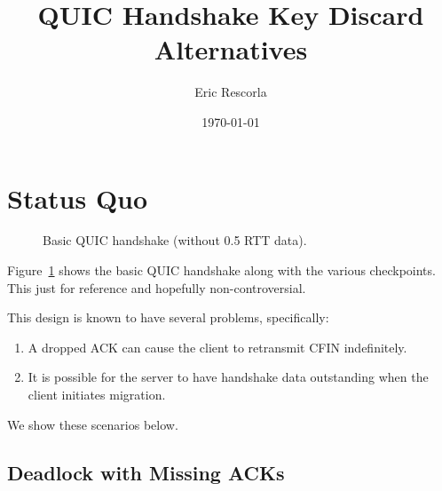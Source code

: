 \documentclass{article}
\title{QUIC Handshake Key Discard Alternatives}
\author{Eric Rescorla}
\date{\today}
\begin{document}
\section{Status Quo}
\label{sec:status-quo}


\begin{figure}[H]
\begin{center}
\end{center}
\caption{Basic QUIC handshake (without 0.5 RTT data).}
\label{fig:basic-handshake}
\end{figure}

Figure~\ref{fig:basic-handshake} shows the basic QUIC handshake along
with the various checkpoints. This just for reference and hopefully
non-controversial.

This design is known to have several problems, specifically:

\begin{enumerate}
\item A dropped ACK can cause the client to retransmit CFIN
  indefinitely.
\item It is possible for the server to have handshake data
  outstanding when the client initiates migration. 
\end{enumerate}

We show these scenarios below.

\subsection{Deadlock with Missing ACKs}
\label{sec:deadl-with-miss}
\end{document}
